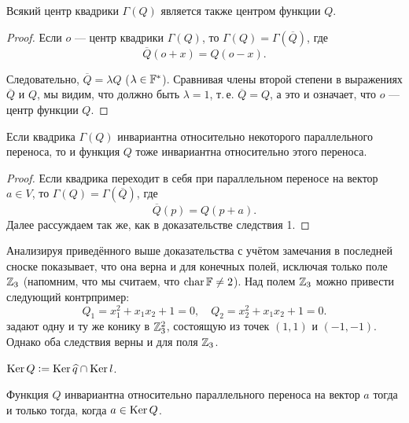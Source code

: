 \begin{corollary}
    Всякий центр квадрики $\Gamma(Q)$ является также центром функции $Q$.
\end{corollary}

\begin{proof}
    Если $o$ --- центр квадрики $\Gamma(Q)$, то $\Gamma(Q) = \Gamma(\overline{Q})$, где
    \[
        \overline{Q}(o + x) = Q(o - x).
    \]

    Следовательно, $\overline{Q} = \lambda Q$ ($\lambda \in \mathbb{F}^\ast$). Сравнивая члены второй степени в выражениях $\overline{Q}$ и $Q$, мы видим, что должно быть $\lambda = 1$, т.\,е. $\overline{Q} = Q$, а это и означает, что $o$ --- центр функции $Q$.
\end{proof}

\begin{corollary}
    Если квадрика $\Gamma(Q)$ инвариантна относительно некоторого параллельного переноса, то и функция $Q$ тоже инвариантна относительно этого переноса.
\end{corollary}

\begin{proof}
    Если квадрика переходит в себя при параллельном переносе на вектор $a \in V$, то $\Gamma(Q) = \Gamma(\overline{Q})$, где
    \[
        \overline{Q}(p) = Q(p + a).
    \]
    Далее рассуждаем так же, как в доказательстве следствия 1.
\end{proof}

\begin{remark}
    Анализируя приведённого выше доказательства с учётом замечания в последней сноске показывает, что она верна и для конечных полей, исключая только поле $\mathbb{Z}_3$ (напомним, что мы считаем, что $\operatorname{char}\mathbb{F} \ne 2$). Над полем $\mathbb{Z}_3$ можно привести следующий контрпример:
    \[
        Q_1 = x_1^2 + x_1x_2 + 1 = 0,\quad Q_2 = x_2^2 + x_1x_2 + 1 = 0.
    \]
    задают одну и ту же конику в $\mathbb{Z}_3^2$, состоящую из точек $(1, 1)$ и $(-1, -1)$. Однако оба следствия верны и для поля $\mathbb{Z}_3$.
\end{remark}

\begin{definition}
    $\operatorname{Ker} Q \vcentcolon = \operatorname{Ker} \widehat{q} \cap \operatorname{Ker} l$.
\end{definition}

\begin{proposal}
    Функция $Q$ инвариантна относительно параллельного переноса на вектор $a$ тогда и только тогда, когда $a \in \operatorname{Ker} Q$.
\end{proposal}

